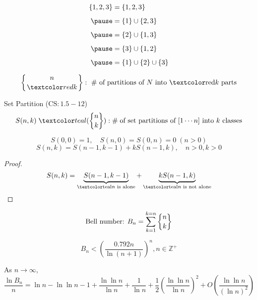 
\begin{frame}{}
  \begin{align*}
    \set{1, 2, 3} &= \set{1, 2, 3} \\[5pt] \pause
                  &= \set{1} \cup \set{2, 3}  \\[5pt] \pause
                  &= \set{2} \cup \set{1, 3}  \\[5pt] \pause
                  &= \set{3} \cup \set{1, 2}  \\[5pt] \pause
                  &= \set{1} \cup \set{2} \cup \set{3}
  \end{align*}

  \[
    \left\{ n \atop \red{k} \right\}: \text{ \# of partitions of $N$ into \red{$k$} parts}
  \]

  \begin{center}
  \end{center}
\end{frame}

\begin{frame}{}
  \begin{exampleblock}{Set Partition ($\text{CS}: 1.5-12$)}
    \[
      S(n,k) \;\teal{(\stirling{n}{k})}: \#\; \text{of set partitions of $[1 \cdots n]$ into $k$ classes}
    \]
  \end{exampleblock}

  \pause
  \vspace{0.30cm}
  \begin{theorem}
    \[
      S(0,0) = 1, \quad S(n,0) = S(0,n) = 0 \; (n > 0)
    \]
    \[
      S(n,k) = S(n-1, k-1) + k S(n-1, k), \quad n > 0, k > 0
    \]
  \end{theorem}

  \pause
  \begin{proof}
    \[
      S(n,k) = \underbrace{S(n-1, k-1)}_{\text{\teal{$n$ is alone}}} + \underbrace{k S(n-1, k)}_{\text{\teal{$n$ is not alone}}}
    \]
  \end{proof}
\end{frame}

\begin{frame}{}
  \[
    \text{Bell number: } B_n = \sum_{k=1}^{k=n} \stirling{n}{k}
  \]

  \pause
  \begin{theorem}
    \[
      B_n < \left( \frac{0.792 n}{\ln( n+1)} \right)^n, n \in \mathbb{Z}^{+}
    \]
  \end{theorem}

  \pause
  \vspace{0.50cm}
  \begin{theorem}[de Bruijn (1981)]
    As $n \to \infty$,
    \[
      \frac{\ln B_n}{n} = \ln n - \ln \ln n - 1 + \frac{\ln \ln n}{\ln n} + \frac{1}{\ln n} 
      + \frac{1}{2}\left(\frac{\ln \ln n}{\ln n}\right)^2 + O\left(\frac{\ln \ln n}{(\ln n)^2} \right)
    \]
  \end{theorem}
\end{frame}
